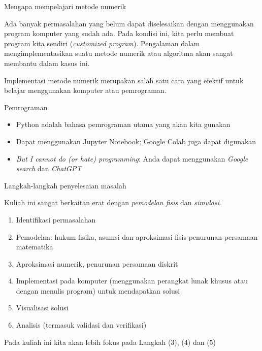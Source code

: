 \begin{frame}{Mengapa mempelajari metode numerik}

Ada banyak permasalahan yang belum dapat diselesaikan dengan menggunakan
program komputer yang sudah ada. Pada kondisi ini, kita perlu membuat program
kita sendiri (\textit{customized program}).
Pengalaman dalam mengimplementasikan suatu metode numerik
atau algoritma akan sangat membantu dalam kasus ini.

Implementasi metode numerik merupakan salah satu cara yang efektif untuk
belajar menggunakan komputer atau pemrograman.


\end{frame}



\begin{frame}{Pemrograman}

\begin{itemize}
\item Python adalah bahasa pemrograman utama yang akan kita gunakan
\item Dapat menggunakan Jupyter Notebook; Google Colab juga dapat digunakan
\item \textit{But I cannot do (or hate) programming}:
Anda dapat menggunakan \textit{Google search} dan \textit{ChatGPT}
\end{itemize}

\end{frame}



\begin{frame}{Langkah-langkah penyelesaian masalah}

Kuliah ini sangat berkaitan erat dengan \textit{pemodelan fisis}
dan \textit{simulasi}.

\begin{enumerate}[(1)]
\item Identifikasi permasalahan
\item Pemodelan: hukum fisika, asumsi dan aproksimasi fisis penurunan
  persamaan matematika
\item Aproksimasi numerik, penurunan persamaan diskrit
\item Implementasi pada komputer (menggunakan perangkat lunak khusus atau
  dengan menulis program) untuk mendapatkan solusi
\item Visualisasi solusi
\item Analisis (termasuk validasi dan verifikasi)
\end{enumerate}

Pada kuliah ini kita akan lebih fokus pada Langkah (3), (4) dan (5)
\end{frame}


